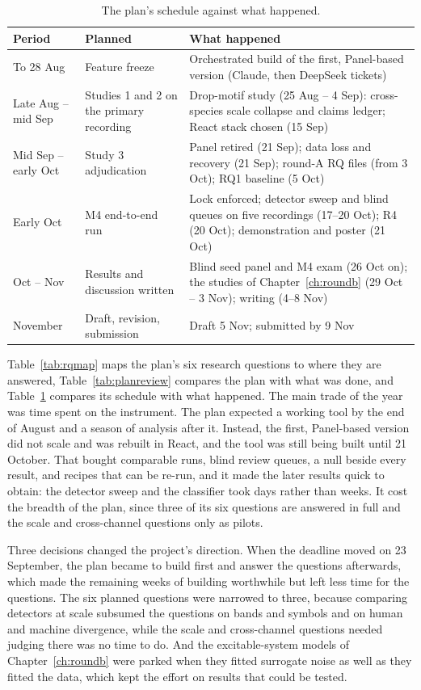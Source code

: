 \begin{table}[htbp]
\caption[{The plan's schedule against what happened.}]{The plan's schedule against what happened.}
\label{tab:schedulereview}
\footnotesize
\begin{tabularx}{\textwidth}{p{2.6cm} p{4.4cm} X}
\toprule
\textbf{Period} & \textbf{Planned} & \textbf{What happened}\\
\midrule
To 28 Aug & Feature freeze & Orchestrated build of the first, Panel-based version (Claude, then DeepSeek tickets)\\
Late Aug -- mid Sep & Studies 1 and 2 on the primary recording & Drop-motif study (25 Aug -- 4 Sep): cross-species scale collapse and claims ledger; React stack chosen (15 Sep)\\
Mid Sep -- early Oct & Study 3 adjudication & Panel retired (21 Sep); data loss and recovery (21 Sep); round-A RQ files (from 3 Oct); RQ1 baseline (5 Oct)\\
Early Oct & M4 end-to-end run & Lock enforced; detector sweep and blind queues on five recordings (17--20 Oct); R4 (20 Oct); demonstration and poster (21 Oct)\\
Oct -- Nov & Results and discussion written & Blind seed panel and M4 exam (26 Oct on); the studies of Chapter~\ref{ch:roundb} (29 Oct -- 3 Nov); writing (4--8 Nov)\\
November & Draft, revision, submission & Draft 5 Nov; submitted by 9 Nov\\
\bottomrule
\end{tabularx}
\end{table}

Table~\ref{tab:rqmap} maps the plan's six research questions to where they are answered, Table~\ref{tab:planreview} compares the plan with what was done, and Table~\ref{tab:schedulereview} compares its schedule with what happened. The main trade of the year was time spent on the instrument. The plan expected a working tool by the end of August and a season of analysis after it. Instead, the first, Panel-based version did not scale and was rebuilt in React, and the tool was still being built until 21 October. That bought comparable runs, blind review queues, a null beside every result, and recipes that can be re-run, and it made the later results quick to obtain: the detector sweep and the classifier took days rather than weeks. It cost the breadth of the plan, since three of its six questions are answered in full and the scale and cross-channel questions only as pilots.

Three decisions changed the project's direction. When the deadline moved on 23 September, the plan became to build first and answer the questions afterwards, which made the remaining weeks of building worthwhile but left less time for the questions. The six planned questions were narrowed to three, because comparing detectors at scale subsumed the questions on bands and symbols and on human and machine divergence, while the scale and cross-channel questions needed judging there was no time to do. And the excitable-system models of Chapter~\ref{ch:roundb} were parked when they fitted surrogate noise as well as they fitted the data, which kept the effort on results that could be tested.


